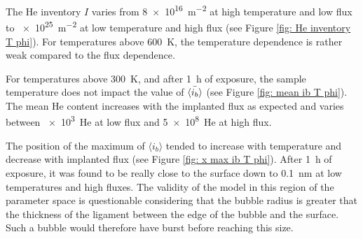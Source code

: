 The He inventory $I$ varies from \SI{8e16}{m^{-2}} at high temperature and low flux to \SI{e25}{m^{-2}} at low temperature and high flux (see Figure \ref{fig: He inventory T phi}).
For temperatures above \SI{600}{K}, the temperature dependence is rather weak compared to the flux dependence.

For temperatures above \SI{300}{K}, and after \SI{1}{h} of exposure, the sample temperature does not impact the value of $\Bar{\langle i_b \rangle}$ (see Figure \ref{fig: mean ib T phi}).
The mean He content increases with the implanted flux as expected and varies between \SI{e3}{He} at low flux and \SI{5e8}{He} at high flux.

The position of the maximum of $\langle i_b \rangle$ tended to increase with temperature and decrease with implanted flux (see Figure \ref{fig: x max ib T phi}).
After \SI{1}{h} of exposure, it was found to be really close to the surface down to \SI{0.1}{nm} at low temperatures and high fluxes.
The validity of the model in this region of the parameter space is questionable considering that the bubble radius is greater that the thickness of the ligament between the edge of the bubble and the surface.
Such a bubble would therefore have burst before reaching this size. 

